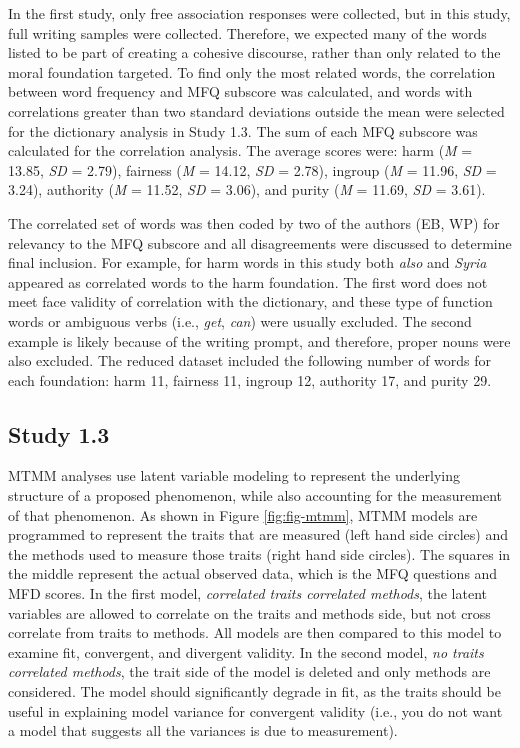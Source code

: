 \documentclass[
  man,floatsintext]{apa6}
\begin{document}
In the first study, only free association responses were collected, but
in this study, full writing samples were collected. Therefore, we
expected many of the words listed to be part of creating a cohesive
discourse, rather than only related to the moral foundation targeted. To
find only the most related words, the correlation between word frequency
and MFQ subscore was calculated, and words with correlations greater
than two standard deviations outside the mean were selected for the
dictionary analysis in Study 1.3. The sum of each MFQ subscore
was calculated for the correlation analysis. The average scores were: harm (\emph{M} =
13.85, \emph{SD} =
2.79), fairness (\emph{M} =
14.12, \emph{SD} =
2.78), ingroup (\emph{M} =
11.96, \emph{SD} =
3.24), authority (\emph{M} =
11.52, \emph{SD} =
3.06), and purity (\emph{M} =
11.69, \emph{SD} =
3.61).

The correlated set of words was then coded by two of the authors (EB, WP) for relevancy to the MFQ subscore and all disagreements were discussed to determine final inclusion. For
example, for harm words in this study both \emph{also} and \emph{Syria} appeared
as correlated words to the harm foundation. The first word does not meet
face validity of correlation with the dictionary, and these type of
function words or ambiguous verbs (i.e., \emph{get}, \emph{can}) were usually
excluded. The second example is likely because of the writing prompt,
and therefore, proper nouns were also excluded. The reduced dataset
included the following number of words for each foundation: harm
11, fairness
11, ingroup
12, authority
17, and purity
29.

\subsection{Study 1.3}\label{study-1.3}

MTMM analyses use latent variable modeling to represent the underlying
structure of a proposed phenomenon, while also accounting for the
measurement of that phenomenon. As shown in Figure \ref{fig:fig-mtmm},
MTMM models are programmed to represent the traits that are measured
(left hand side circles) and the methods used to measure those traits
(right hand side circles). The squares in the middle represent the
actual observed data, which is the MFQ questions and MFD scores. In the
first model, \emph{correlated traits correlated methods}, the latent
variables are allowed to correlate on the traits and methods side, but
not cross correlate from traits to methods. All models are then compared
to this model to examine fit, convergent, and divergent validity. In the
second model, \emph{no traits correlated methods}, the trait side of the
model is deleted and only methods are considered. The model should
significantly degrade in fit, as the traits should be useful in
explaining model variance for convergent validity (i.e., you do not want
a model that suggests all the variances is due to measurement).
\end{document}
